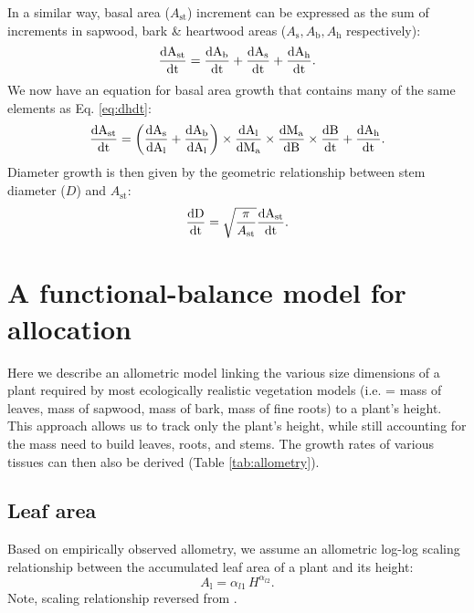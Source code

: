 \documentclass[10pt,twoside]{article}
\begin{document}
In a similar way, basal area ($A_\textrm{st}$) increment can be
expressed as the sum of increments in sapwood, bark \& heartwood areas
($A_\textrm{s}, A_\textrm{b}, A_\textrm{h}$ respectively):
$$\frac{\rm{d}A_\textrm{st}}{\rm{d}t} = \frac{\rm{d}A_\textrm{b}}{\rm{d}t} + \frac{\rm{d}A_\textrm{s}}{\rm{d}t} + \frac{\rm{d}A_\textrm{h}}{\rm{d}t}.$$
We now have an equation for basal area growth that contains many of the same
elements as Eq. \ref{eq:dhdt}:
\begin{equation}\label{eq:dast}
\frac{\rm{d}A_\textrm{st}}{\rm{d}t} = \left(\frac{\rm{d}A_\textrm{s}}{\rm{d}A_\textrm{l}} + \frac{\rm{d}A_\textrm{b}}{\rm{d}A_\textrm{l}}\right) \times
\frac{\rm{d}A_\textrm{l}}{\rm{d}M_\textrm{a}} \times \frac{\rm{d}M_\textrm{a}}{\rm{d}B} \times \frac{\rm{d}B}{\rm{d}t} + \frac{\rm{d}A_\textrm{h}}{\rm{d}t} .
\end{equation}
Diameter growth is then given by the geometric relationship between stem
diameter ($D$) and $A_\textrm{st}$:
\begin{equation} \label{eq:dDdt}
\frac{\rm{d}D}{\rm{d}t} = \sqrt{\frac{\pi}{A_\textrm{st}}} \frac{\rm{d}A_\textrm{st}}{\rm{d}t}.
\end{equation}

\section{A functional-balance model for
allocation}\label{a-functional-balance-model-for-allocation}

Here we describe an allometric model linking the various size dimensions
of a plant required by most ecologically realistic vegetation models
(i.e. = mass of leaves, mass of sapwood, mass of bark, mass of fine
roots) to a plant's height. This approach allows us to track only the
plant's height, while still accounting for the mass need to build
leaves, roots, and stems. The growth rates of various tissues can then
also be derived (Table \ref{tab:allometry}).

\subsection{Leaf area}\label{leaf-area}

Based on empirically observed allometry, we assume an allometric log-log
scaling relationship between the accumulated leaf area of a plant and
its height:
\begin{equation}\label{eq:ha}
A_\textrm{l} = \alpha_{l1} \, H^{\alpha_{l2}}.
\end{equation}
Note, scaling relationship reversed from \citep{Falster-2011}.
\end{document}
